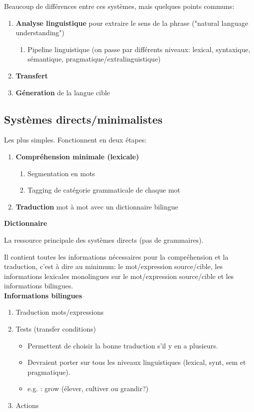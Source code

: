 Beaucoup de différences entre ces systèmes, mais quelques points communs:

\begin{enumerate}
    \item \textbf{Analyse linguistique} pour extraire le sens de la phrase
    ("natural language understanding")
    \begin{enumerate}
        \item Pipeline linguistique (on passe par différents niveaux: lexical,
        syntaxique, sémantique, pragmatique/extralinguistique)
    \end{enumerate}
    \item \textbf{Transfert}
    \item \textbf{Géneration} de la langue cible
\end{enumerate}

\subsection{Systèmes directs/minimalistes}

Les plus simples. Fonctionnent en deux étapes:

\begin{enumerate}
    \item \textbf{Compréhension minimale (lexicale)}
    \begin{enumerate}
        \item Segmentation en mots
        \item Tagging de catégorie grammaticale de chaque mot
    \end{enumerate}
    \item \textbf{Traduction} mot à mot avec un dictionnaire bilingue
\end{enumerate}

\textbf{Dictionnaire}

La ressource principale des systèmes directs (pas de grammaires).

Il contient toutes les informations nécessaires pour la compréhension et la traduction,
c'est à dire au minimum: le mot/expression source/cible, les informations lexicales monolingues sur le mot/expression source/cible et les informations bilingues.\\

\textbf{Informations bilingues}

\begin{enumerate}
    \item Traduction mots/expressions
    \item Tests (transfer conditions)
    \begin{itemize}
        \item Permettent de choisir la bonne traduction s'il y en a plusieurs.
        \item Devraient porter sur tous les niveaux linguistiques (lexical, synt, sem et pragmatique).
        \item e.g. : grow (élever, cultiver ou grandir?)
    \end{itemize}
    \item Actions
\end{enumerate}

